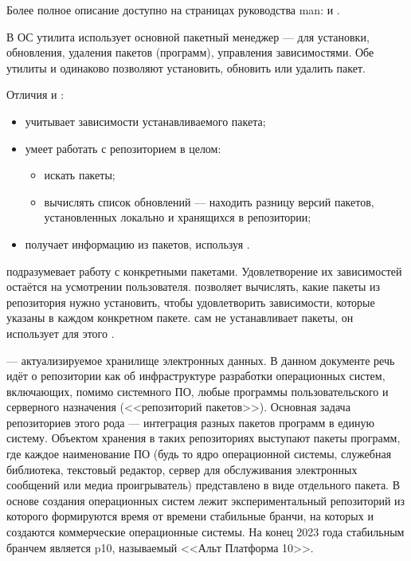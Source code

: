	Более полное описание доступно на страницах руководства man:
	 и .

В ОС  утилита  использует основной пакетный менеджер  --- 
 для установки, обновления, удаления пакетов (программ), управления зависимостями. Обе 
утилиты  и  одинаково позволяют установить, обновить или удалить пакет.

Отличия  и :
\begin{itemize}
	\item {} учитывает зависимости устанавливаемого пакета;
	\item {} умеет работать с репозиторием в целом:
	\begin{itemize}
		\item искать пакеты;
		\item вычислять список обновлений --- находить разницу версий пакетов, 
			установленных локально и хранящихся в репозитории;
	\end{itemize}
	\item {} получает информацию из пакетов, используя .
\end{itemize}

 подразумевает работу с конкретными пакетами. Удовлетворение их зависимостей остаётся 
на усмотрении пользователя.  позволяет вычислять, какие пакеты из репозитория нужно установить, 
чтобы удовлетворить зависимости, которые указаны в каждом конкретном  пакете.  
сам не устанавливает пакеты, он использует для этого .

	
 --- актуализируемое хранилище электронных данных.
В данном документе речь идёт о репозитории как об инфраструктуре разработки операционных систем, включающих, 
помимо системного ПО, любые программы пользовательского и серверного назначения (<<репозиторий пакетов>>). 
Основная задача репозиториев этого рода --- интеграция разных пакетов программ в единую систему. Объектом 
хранения в таких репозиториях выступают пакеты программ, где каждое наименование ПО (будь то ядро операционной 
системы, служебная библиотека, текстовый редактор, сервер для обслуживания электронных сообщений или медиа 
проигрыватель) представлено в виде отдельного пакета. В основе создания операционных систем  лежит 
экспериментальный репозиторий  из которого формируются время от времени стабильные бранчи, 
на которых и создаются коммерческие операционные системы. На конец 2023 года стабильным бранчем является p10, 
называемый <<Альт Платформа 10>>.


